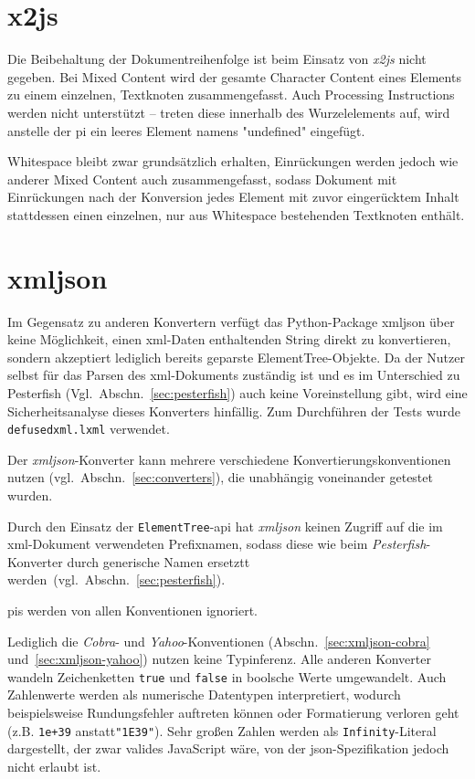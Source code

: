 \section{x2js}
\label{sec:x2js}

Die Beibehaltung der Dokumentreihenfolge ist beim Einsatz von \emph{x2js} nicht gegeben. Bei Mixed Content wird der gesamte Character Content eines Elements zu einem einzelnen, Textknoten zusammengefasst. Auch Processing Instructions werden nicht unterstützt -- treten diese innerhalb des Wurzelelements auf, wird anstelle der \gls{pi} ein leeres Element namens "undefined" eingefügt.

Whitespace bleibt zwar grundsätzlich erhalten, Einrückungen werden jedoch wie anderer Mixed Content auch zusammengefasst, sodass Dokument mit Einrückungen nach der Konversion jedes Element mit zuvor eingerücktem Inhalt stattdessen einen einzelnen, nur aus Whitespace bestehenden Textknoten enthält.

\section{xmljson}
\label{sec:xmljson}

Im Gegensatz zu anderen Konvertern verfügt das Python-Package xmljson über keine Möglichkeit, einen \acrshort{xml}-Daten enthaltenden String direkt zu konvertieren, sondern akzeptiert lediglich bereits geparste ElementTree-Objekte. Da der Nutzer selbst für das Parsen des \acrshort{xml}-Dokuments zuständig ist und es im Unterschied zu Pesterfish (Vgl.~Abschn.~\ref{sec:pesterfish}) auch keine Voreinstellung gibt, wird eine Sicherheitsanalyse dieses Konverters hinfällig. Zum Durchführen der Tests wurde \texttt{defusedxml.lxml} verwendet.

Der \emph{xmljson}-Konverter kann mehrere verschiedene Konvertierungskonventionen nutzen (vgl.~Abschn.~\ref{sec:converters}), die unabhängig voneinander getestet wurden.

Durch den Einsatz der \texttt{ElementTree}-\acrshort{api} hat \emph{xmljson} keinen Zugriff auf die im \acrshort{xml}-Dokument verwendeten Prefixnamen, sodass diese wie beim \emph{Pesterfish}-Konverter durch generische Namen ersetztt werden~(vgl.~Abschn.~\ref{sec:pesterfish}).

\glspl{pi} werden von allen Konventionen ignoriert.

Lediglich die \emph{Cobra}- und \emph{Yahoo}-Konventionen (Abschn.~\ref{sec:xmljson-cobra} und~\ref{sec:xmljson-yahoo}) nutzen keine Typinferenz. Alle anderen Konverter wandeln Zeichenketten \texttt{true} und \texttt{false} in boolsche Werte umgewandelt. Auch Zahlenwerte werden als numerische Datentypen interpretiert, wodurch beispielsweise Rundungsfehler auftreten können oder Formatierung verloren geht (z.B. \texttt{1e+39} anstatt\texttt{"1E39"}). Sehr großen Zahlen werden als \texttt{Infinity}-Literal dargestellt, der zwar valides JavaScript wäre, von der \acrshort{json}-Spezifikation jedoch nicht erlaubt ist.

